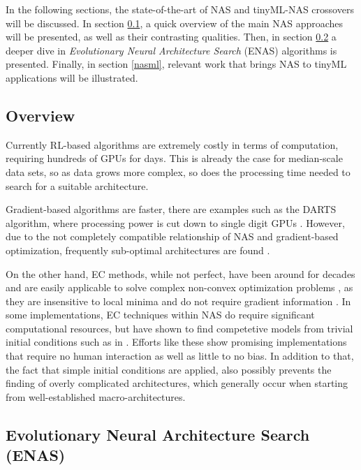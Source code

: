 \documentclass[10pt,        %
               a4paper,     %
               journal,     %
               ]{IEEEtran}
\begin{document}
In the following sections, the state-of-the-art of NAS and tinyML-NAS crossovers will be discussed. In
section \ref{OV}, a quick overview of the main NAS approaches will be presented, as well as their contrasting qualities.
Then, in section \ref{EV} a deeper dive in \textit{Evolutionary Neural Architecture Search} (ENAS) algorithms is presented. Finally, in
section \ref{nasml}, relevant work that brings NAS to tinyML applications will be illustrated.

\subsection{Overview}
\label{OV}
Currently RL-based algorithms are extremely costly in terms of computation, requiring hundreds of
GPUs for days. This is already the case for median-scale data sets, so as
data grows more complex, so does the processing time needed to search for a suitable architecture.

Gradient-based algorithms are faster, there are examples such as the DARTS algorithm, where processing power
is cut down to single digit GPUs \cite{liu2018darts}. However, due to the not completely compatible relationship
of NAS and gradient-based optimization, frequently sub-optimal architectures are found \cite{liu2021survey}.

On the other hand, EC methods, while not perfect, have been around for decades and are easily applicable
to solve complex non-convex optimization problems \cite{sun2018igd}, as they are insensitive to local minima
and do not require gradient information \cite{liu2021survey}. In some implementations, EC techniques within
NAS do require significant computational resources, but have shown to find competetive models from trivial initial
conditions such as in \cite{pmlr-v70-real17a}. Efforts like these show promising implementations that require
no human interaction as well as little to no bias. In addition to that, the fact that simple initial conditions are applied,
also possibly prevents the finding of overly complicated architectures, which generally occur when starting from
well-established macro-architectures.

\subsection{Evolutionary Neural Architecture Search (ENAS)}
\label{EV}
\end{document}
